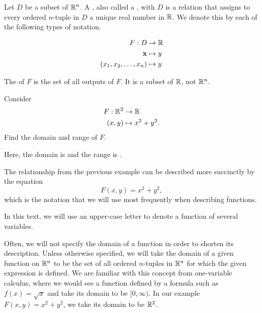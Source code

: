\documentclass{ximera}
\begin{document}
\begin{definition}
  Let $D$ be a subset of $\R^n$.  A , also called a , with  $D$ is a relation that assigns to
  every ordered $n$-tuple in $D$ a unique real number in $\mathbb R$.  We
  denote this by each of the following types of notation.

  \begin{align*}
    F: D &\to \mathbb R\\
    \mathbf{x} &\mapsto y\\
    \left(x_1,x_2,\dots,x_n\right) &\mapsto y
  \end{align*}
  
  The  of $F$ is the set of all outputs of $F$.  It is a
  subset of $\mathbb R$, not $\R^n$.
\end{definition}

\begin{example}
  Consider
  \begin{align*}
    F: \mathbb R^2 &\to \mathbb R\\
    (x,y) &\mapsto x^2+y^2.
  \end{align*}
  Find the domain and range of $F$.
  \begin{explanation}
    Here, the domain is 
    and the range is \wordChoice{\choice{$(-\infty,\infty)$}\choice[correct]{$[0,\infty)$}\choice{$\R^2$}\choice{$\R^n$}}.
  \end{explanation}
\end{example}
The relationship from the previous example can be described more
succinctly by the equation
\[
F(x,y)=x^2+y^2,
\]
which is the notation that we will use most frequently 
when describing functions.

\begin{remark}
  In this text, we will use an upper-case letter to denote a function
  of several variables.
\end{remark}

  Often, we will not specify the domain of a function in order to
  shorten its description.  Unless otherwise specified, we will take the
  domain of a given function on $\R^n$ to be the set of all ordered
  $n$-tuples in $\R^n$ for which the given expression is defined. We are familiar with this 
  concept from one-variable calculus, where we would see a function defined by a formula such as 
  $f(x) = \sqrt{x}$ and take its domain to be $[0, \infty)$.  In our example
 $F(x,y) = x^2+y^2$, we take its domain to be $\R^2$.
\end{document}
